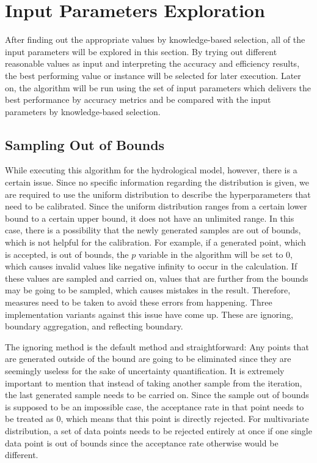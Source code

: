 \section{Input Parameters Exploration}
After finding out the appropriate values by knowledge-based selection, all of the input parameters will be explored in this section. By trying out different reasonable values as input and interpreting the accuracy and efficiency results, the best performing value or instance will be selected for later execution. Later on, the algorithm will be run using the set of input parameters which delivers the best performance by accuracy metrics and be compared with the input parameters by knowledge-based selection.

\subsection{Sampling Out of Bounds}
While executing this algorithm for the hydrological model, however, there is a certain issue. Since no specific information regarding the distribution is given, we are required to use the uniform distribution to describe the hyperparameters that need to be calibrated. Since the uniform distribution ranges from a certain lower bound to a certain upper bound, it does not have an unlimited range. In this case, there is a possibility that the newly generated samples are out of bounds, which is not helpful for the calibration. For example, if a generated point, which is accepted, is out of bounds, the $p$ variable in the algorithm will be set to 0, which causes invalid values like negative infinity to occur in the calculation. If these values are sampled and carried on, values that are further from the bounds may be going to be sampled, which causes mistakes in the result. Therefore, measures need to be taken to avoid these errors from happening. Three implementation variants against this issue have come up. These are ignoring, boundary aggregation, and reflecting boundary.

The ignoring method is the default method and straightforward: Any points that are generated outside of the bound are going to be eliminated since they are seemingly useless for the sake of uncertainty quantification. It is extremely important to mention that instead of taking another sample from the iteration, the last generated sample needs to be carried on. Since the sample out of bounds is supposed to be an impossible case, the acceptance rate in that point needs to be treated as 0, which means that this point is directly rejected. For multivariate distribution, a set of data points needs to be rejected entirely at once if one single data point is out of bounds since the acceptance rate otherwise would be different.

